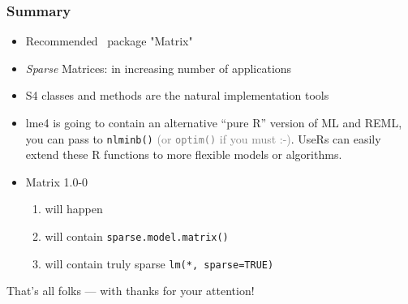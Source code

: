 \documentclass[dvipsnames,pdflatex,beamer]{beamer}
\begin{document}
\begin{frame}\frametitle{Summary}

\begin{itemize}[<+->]
 \item Recommended \RR\ package "Matrix"
 \item \emph{Sparse} Matrices: in increasing number of applications
 \item S4 classes and methods are \alert{the} natural implementation tools

 \item lme4 is going to contain an alternative ``pure R'' version of ML and REML,
   you can pass to \texttt{nlminb()} \textcolor{gray}{(or \texttt{optim()}
     if you must :-)}.
   UseRs can easily extend these R functions to more flexible models or
   algorithms.

 \item Matrix 1.0-0
   \begin{enumerate}[<+->]
   \item will happen
   \item will contain \texttt{sparse.model.matrix()}
   \item will contain truly sparse \texttt{lm(*, sparse=TRUE)}
   \end{enumerate}
\end{itemize}
\pause

\bigskip

\bigskip
\begin{block}{}
   That's all folks --- with thanks for your attention!
\end{block}

\end{frame}
\end{document}
